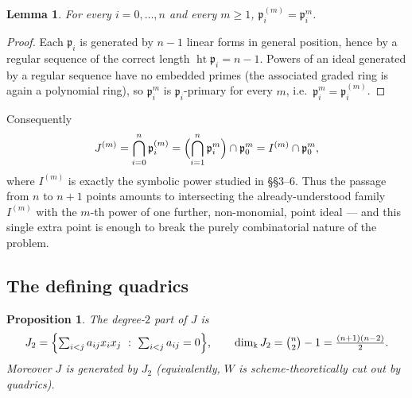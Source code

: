 \documentclass[11pt]{article}
\newtheorem{proposition}[theorem]{Proposition}
\newtheorem{lemma}[theorem]{Lemma}
\newcommand{\p}{\mathfrak p}
\begin{document}
\begin{lemma}\label{lem:ci-primes}
For every \(i=0,\dots,n\) and every \(m\ge1\), \(\p_i^{(m)}=\p_i^m\).
\end{lemma}

\begin{proof}
Each \(\p_i\) is generated by \(n-1\) linear forms in general
position, hence by a regular sequence of the correct length
\(\operatorname{ht}\p_i=n-1\).  Powers of an ideal generated by a
regular sequence have no embedded primes (the associated graded ring
is again a polynomial ring), so \(\p_i^m\) is \(\p_i\)-primary for
every \(m\), i.e.\ \(\p_i^m=\p_i^{(m)}\).
\end{proof}

Consequently
\[
 J^{(m)}=\bigcap_{i=0}^n\p_i^{(m)}=\Bigl(\bigcap_{i=1}^n\p_i^m\Bigr)\cap\p_0^m
 =I^{(m)}\cap\p_0^m,
\]
where \(I^{(m)}\) is exactly the symbolic power studied in
\S\S3--6.  Thus the passage from \(n\) to \(n+1\) points amounts to
intersecting the already-understood family \(I^{(m)}\) with the
\(m\)-th power of one further, non-monomial, point ideal --- and this single
extra point is enough to break the purely combinatorial nature of the
problem.

\subsection{The defining quadrics}

\begin{proposition}\label{prop:quadrics}
The degree-\(2\) part of \(J\) is
\[
 J_2=\Bigl\{\textstyle\sum_{i<j}a_{ij}x_ix_j\ :\ \sum_{i<j}a_{ij}=0\Bigr\},
 \qquad
 \dim_\Bbbk J_2=\binom n2-1=\frac{(n+1)(n-2)}2.
\]
Moreover \(J\) is generated by \(J_2\) (equivalently, \(W\) is
scheme-theoretically cut out by quadrics).
\end{proposition}
\end{document}
